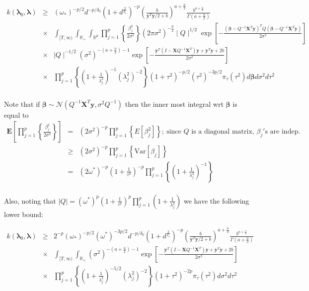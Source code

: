 \documentclass[noinfoline,11pt]{imsart}
\numberwithin{equation}{section}
\theoremstyle{plain}
\newcommand{\y}{\mathbf{y}}
\newcommand{\X}{\mathbf{X}}
\newcommand{\bb}{\boldsymbol{\beta}}
\newcommand{\bl}{\boldsymbol{\lambda}}
\newcommand{\E}{\boldsymbol{E}}
\begin{document}
\begin{eqnarray*}
k\left(\bl_0,\bl\right) &\geq&
\left(\omega_*\right)^{-p/2}d^{-p/\delta_0}\left(1+d^{\frac{2}{\delta_1}}\right)^{-p}\left(\frac{b}{\y^T\y/2+b}\right)^{a+\frac{n}{2}}\frac{b^{a+\frac{n}{2}}}{\Gamma\left(a+\frac{n}{2}\right)} \nonumber \\
&\times& \int_{[T,\infty)}\int_{\mathbb{R}_+}\int_{\mathbb{R}^p}\prod_{j=1}^p\left\{\frac{\beta_j^2}{2\sigma^2}\right\}\left(2\pi\sigma^2\right)^{-\frac{p}{2}}\mid Q\mid ^{1/2}\exp{\left[-\frac{\left(\boldsymbol{\beta}-Q^{-1}\X^T\y\right)^T Q\left(\boldsymbol{\beta}-Q^{-1}\X^T\y\right)}{2\sigma^2}\right]}\nonumber \\
&\times& \mid Q\mid ^{-1/2}\left(\sigma^2\right)^{-\left(a+\frac{n}{2}\right)-1}\exp{\left[-\frac{\y^T\left(I-\X Q^{-1}\X^T\right)\y+\y^T\y+2b}{2\sigma^2}\right]} \nonumber \\&\times& \prod_{j=1}^p\left\{\left(1+\frac{1}{\lambda_j^2}\right)^{-1}\left(\lambda_j^2\right)^{-2}\right\}\left(1+\tau^2\right)^{-p/2}\left(\tau^2\right)^{-3p/2}\pi_\tau\left(\tau^2\right)d\boldsymbol{\beta}d\sigma^2d\tau^2\nonumber \\
\end{eqnarray*}

\noindent
Note that if $\bb\sim \mathcal{N}\left(Q^{-1}\X^T\y,\sigma^2Q^{-1}\right)$ then the inner most integral wrt $\bb$ is equal to 
\begin{eqnarray*}
    \E\left[\prod\limits_{j=1}^p\left\{\frac{\beta_j^2}{2\sigma^2}\right\}\right] &=& \left(2\sigma^2\right)^{-p}\prod\limits_{j=1}^p\left\{ E\left[\beta_j^2\right]\right\};\ \text{since $Q$ is a diagonal matrix, $\beta_j'$s are indep.}\nonumber \\
    &\geq& \left(2\sigma^2\right)^{-p}\prod\limits_{j=1}^p\left\{ \text{Var}\left[\beta_j\right]\right\} \nonumber \\
    &=& \left(2\omega^*\right)^{-p}\left(1+\frac{1}{\tau^2}\right)^{-p}\prod\limits_{j=1}^p\left\{\left(1+\frac{1}{\lambda_j^2}\right)^{-1}\right\} \nonumber \\
\end{eqnarray*} 

\noindent
Also, noting that $\mid Q\mid=(\omega^*)^p\left(1+\frac{1}{\tau^2}\right)^p\prod\limits_{j=1}^p\left(1+\frac{1}{\lambda_j^2}\right)$ we have the following lower bound:

\begin{eqnarray*}
k\left(\bl_0,\bl\right) &\geq& 2^{-p}\left(\omega_*\right)^{-p/2}\left(\omega^*\right)^{-3p/2}d^{-p/\delta_0}\left(1+d^{\frac{2}{\delta_1}}\right)^{-p}\left(\frac{b}{\y^T\y/2+b}\right)^{a+\frac{n}{2}}\frac{b^{a+\frac{n}{2}}}{\Gamma\left(a+\frac{n}{2}\right)} \nonumber \\
&\times& \int_{[T,\infty)}\int_{\mathbb{R}_+}
\left(\sigma^2\right)^{-\left(a+\frac{n}{2}\right)-1}\exp{\left[-\frac{\y^T\left(I-\X Q^{-1}\X^T\right)\y+\y^T\y+2b}{2\sigma^2}\right]} \nonumber \\
&\times& \prod_{j=1}^p\left\{\left(1+\frac{1}{\lambda_j^2}\right)^{-5/2}\left(\lambda_j^2\right)^{-2}\right\}\left(1+\tau^2\right)^{-2p}\pi_\tau\left(\tau^2\right)d\sigma^2d\tau^2\nonumber \\
\end{eqnarray*}
\end{document}
